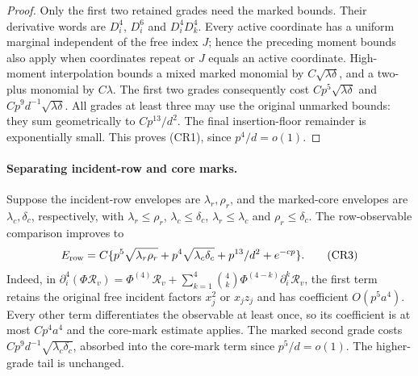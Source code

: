 \documentclass[10pt]{article}
\numberwithin{equation}{section}
\newcommand{\1}{\mathbf1}
\begin{document}
\begin{proof}
Only the first two retained grades need the marked bounds.
Their derivative words are $D_i^4$, $D_i^6$ and $D_i^4D_k^4$.
Every active coordinate has a uniform marginal independent of the
free index $J$; hence the preceding moment bounds also apply when
coordinates repeat or $J$ equals an active coordinate.
High-moment interpolation bounds a mixed marked monomial by
$C\sqrt{\lambda\delta}$, and a two-plus monomial by $C\lambda$.
The first two grades consequently cost
$Cp^5\sqrt{\lambda\delta}$ and
$Cp^9d^{-1}\sqrt{\lambda\delta}$.
All grades at least three may use the original unmarked bounds:
they sum geometrically to $Cp^{13}/d^2$.
The final insertion-floor remainder is exponentially small.
This proves (CR1), since $p^4/d=o(1)$.

\end{proof}

\paragraph{Separating incident-row and core marks.}
Suppose the incident-row envelopes are $\lambda_r,\rho_r$, and the
marked-core envelopes are $\lambda_c,\delta_c$, respectively, with
$\lambda_r\le\rho_r$, $\lambda_c\le\delta_c$,
$\lambda_r\le\lambda_c$ and $\rho_r\le\delta_c$.
The row-observable comparison improves to
\[
 E_{\rm row}=C\{p^5\sqrt{\lambda_r\rho_r}
             +p^4\sqrt{\lambda_c\delta_c}+p^{13}/d^2+e^{-cp}\}.
 \tag{CR3}\label{eq:split-row-comparison}
\]
Indeed, in
$\partial_i^4(\Phi\mathcal R_v)=\Phi^{(4)}\mathcal R_v
+\sum_{k=1}^4\binom{4}{k}\Phi^{(4-k)}\partial_i^k\mathcal R_v$,
the first term retains the original free incident factors
$x_j^2$ or $x_jz_j$ and has coefficient $O(p^5a^4)$.
Every other term differentiates the observable at least once,
so its coefficient is at most $Cp^4a^4$ and the core-mark estimate
applies. The marked second grade costs
$Cp^9d^{-1}\sqrt{\lambda_c\delta_c}$, absorbed into the core-mark
term since $p^5/d=o(1)$. The higher-grade tail is unchanged.
\end{document}
